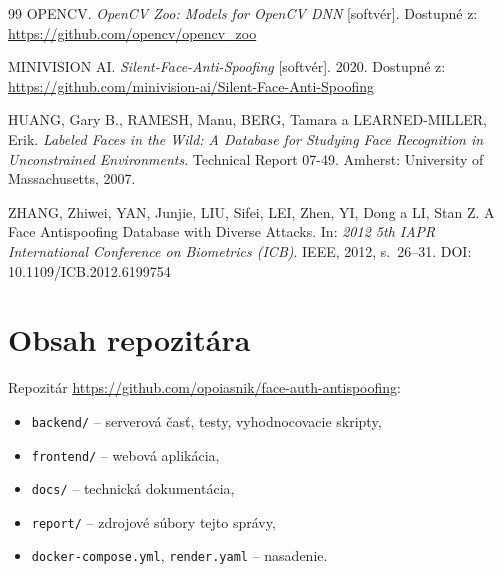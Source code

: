 \documentclass[12pt,a4paper,oneside]{report}
\begin{document}
\begin{thebibliography}{99}
OPENCV. \textit{OpenCV Zoo: Models for OpenCV DNN} [softvér].
Dostupné z: \url{https://github.com/opencv/opencv_zoo}

MINIVISION AI. \textit{Silent-Face-Anti-Spoofing} [softvér]. 2020.
Dostupné z: \url{https://github.com/minivision-ai/Silent-Face-Anti-Spoofing}

HUANG, Gary B., RAMESH, Manu, BERG, Tamara a LEARNED-MILLER, Erik.
\textit{Labeled Faces in the Wild: A Database for Studying Face Recognition in
Unconstrained Environments}. Technical Report 07-49. Amherst: University of
Massachusetts, 2007.

ZHANG, Zhiwei, YAN, Junjie, LIU, Sifei, LEI, Zhen, YI, Dong a LI, Stan Z.
A Face Antispoofing Database with Diverse Attacks.
In: \textit{2012 5th IAPR International Conference on Biometrics (ICB)}.
IEEE, 2012, s.~26--31.
DOI: 10.1109/ICB.2012.6199754

\end{thebibliography}

\appendix

\chapter{Obsah repozitára}
\label{app:repo}

Repozitár \url{https://github.com/opoiasnik/face-auth-antispoofing}:

\begin{itemize}
  \item \texttt{backend/} -- serverová časť, testy, vyhodnocovacie skripty,
  \item \texttt{frontend/} -- webová aplikácia,
  \item \texttt{docs/} -- technická dokumentácia,
  \item \texttt{report/} -- zdrojové súbory tejto správy,
  \item \texttt{docker-compose.yml}, \texttt{render.yaml} -- nasadenie.
\end{itemize}
\end{document}
